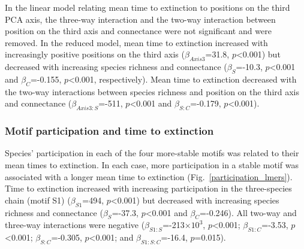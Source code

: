 \documentclass[12pt]{article}
\begin{document}
			In the linear model relating mean time to extinction to positions on the third PCA axis, the three-way interaction and the two-way interaction between position on the third axis and connectance were not significant and were removed. In the reduced model, mean time to extinction increased with increasingly positive positions on the third axis ($\beta_{Axis3}$=31.8, $p$\textless0.001) but decreased with increasing species richness and connectance ($\beta_{S}$=-10.3, $p$\textless0.001 and $\beta_{C}$=-0.155, $p$\textless0.001, respectively). Mean time to extinction decreased with the two-way interactions between species richness and position on the third axis and connectance ($\beta_{Axis3:S}$=-511, $p$\textless0.001 and $\beta_{S:C}$=-0.179, $p$\textless0.001).


		\subsubsection*{Motif participation and time to extinction}

			Species' participation in each of the four more-stable motifs was related to their mean times to extinction. In each case, more participation in a stable motif was associated with a longer mean time to extinction (Fig.~\ref{participation_lmers}).
			Time to extinction increased with increasing participation in the three-species chain (motif S1) ($\beta_{S1}$=494, $p$\textless0.001) but decreased with increasing species richness and connectance ($\beta_{S}$=-37.3, $p$\textless0.001 and $\beta_{C}$=-0.246). All two-way and three-way interactions were negative ($\beta_{S1:S}$=-213$\times10^3$, $p$\textless0.001; $\beta_{S1:C}$=-3.53, $p$\textless0.001; $\beta_{S:C}$=-0.305, $p$\textless0.001; and $\beta_{S1:S:C}$=-16.4, $p$=0.015). 
\end{document}
